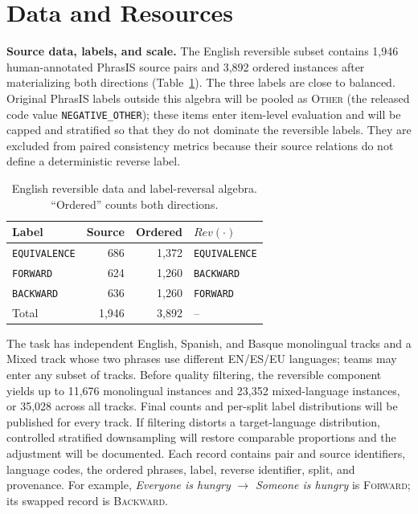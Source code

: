 \documentclass[11pt]{article}
\newif\ifshowrevisions
\newcommand{\rev}[1]{\ifshowrevisions{\color{revisionblue}#1}\else#1\fi}
\newcommand{\ForwardLabel}{\textsc{Forward}}
\newcommand{\BackwardLabel}{\textsc{Backward}}
\newcommand{\NegativeLabel}{\textsc{Other}}
\begin{document}
\section{Data and Resources}

\textbf{Source data, labels, and scale.}
The English reversible subset contains 1,946 human-annotated PhrasIS source pairs and 3,892 ordered instances after materializing both directions (Table~\ref{tab:data}).
The three labels are close to balanced.
Original PhrasIS labels outside this algebra will be pooled as \NegativeLabel{} (the released code value \texttt{NEGATIVE\_OTHER}); these items enter item-level evaluation and will be capped and stratified so that they do not dominate the reversible labels.
They are excluded from paired consistency metrics because their source relations do not define a deterministic reverse label.

\begin{table}[t]
\centering
\ifshowrevisions\color{revisionblue}\fi
\footnotesize
\begin{tabular}{@{}lrrl@{}}
\toprule
Label & Source & Ordered & $Rev(\cdot)$ \\
\midrule
\texttt{EQUIVALENCE} & 686 & 1,372 & \texttt{EQUIVALENCE} \\
\texttt{FORWARD} & 624 & 1,260 & \texttt{BACKWARD} \\
\texttt{BACKWARD} & 636 & 1,260 & \texttt{FORWARD} \\
\midrule
Total & 1,946 & 3,892 & -- \\
\bottomrule
\end{tabular}
\caption{English reversible data and label-reversal algebra. ``Ordered'' counts both directions.}
\label{tab:data}
\end{table}

\rev{The task has independent English, Spanish, and Basque monolingual tracks and a Mixed track whose two phrases use different EN/ES/EU languages; teams may enter any subset of tracks. Before quality filtering, the reversible component yields up to 11,676 monolingual instances and 23,352 mixed-language instances, or 35,028 across all tracks. Final counts and per-split label distributions will be published for every track. If filtering distorts a target-language distribution, controlled stratified downsampling will restore comparable proportions and the adjustment will be documented.}
Each record contains pair and source identifiers, language codes, the ordered phrases, label, reverse identifier, split, and provenance.
For example, \emph{Everyone is hungry} $\rightarrow$ \emph{Someone is hungry} is \ForwardLabel{}; its swapped record is \BackwardLabel{}.
\end{document}
